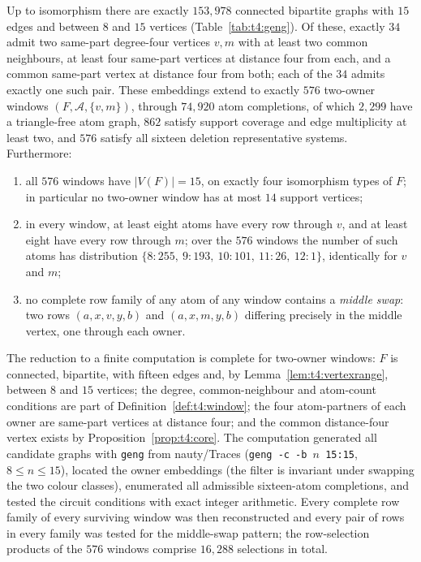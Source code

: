 \begin{theorem}\label{thm:t4:census}
Up to isomorphism there are exactly \(153{,}978\) connected bipartite
graphs with \(15\) edges and between \(8\) and \(15\) vertices
\textup{(}Table~\textup{\ref{tab:t4:geng}}\textup{)}. Of these, exactly
\(34\) admit two same-part degree-four vertices \(v,m\) with at least
two common neighbours, at least four same-part vertices at distance
four from each, and a common same-part vertex at distance four from
both; each of the \(34\) admits exactly one such pair. These
embeddings extend to exactly \(576\) two-owner windows
\((F,\mathcal A,\{v,m\})\), through \(74{,}920\) atom completions, of
which \(2{,}299\) have a triangle-free atom graph, \(862\) satisfy
support coverage and edge multiplicity at least two, and \(576\)
satisfy all sixteen deletion representative systems. Furthermore:
\begin{enumerate}[label=\textup{(\roman*)}]
\item all \(576\) windows have \(|V(F)|=15\), on exactly four
isomorphism types of \(F\); in particular no two-owner window has at
most \(14\) support vertices;
\item in every window, at least eight atoms have every row through
\(v\), and at least eight have every row through \(m\); over the
\(576\) windows the number of such atoms has distribution
\(\{8{:}255,\ 9{:}193,\ 10{:}101,\ 11{:}26,\ 12{:}1\}\), identically
for \(v\) and \(m\);
\item no complete row family of any atom of any window contains a
\emph{middle swap}: two rows \((a,x,v,y,b)\) and \((a,x,m,y,b)\)
differing precisely in the middle vertex, one through each owner.
\end{enumerate}
\end{theorem}

The reduction to a finite computation is complete for two-owner
windows: \(F\) is connected, bipartite, with fifteen edges and, by
Lemma~\ref{lem:t4:vertexrange}, between \(8\) and \(15\) vertices; the
degree, common-neighbour and atom-count conditions are part of
Definition~\ref{def:t4:window}; the four atom-partners of each owner
are same-part vertices at distance four; and the common distance-four
vertex exists by Proposition~\ref{prop:t4:core}. The computation
generated all candidate graphs with \texttt{geng} from nauty/Traces
\cite{McKayPiperno14} (\texttt{geng -c -b \(n\) 15:15},
\(8\le n\le15\)), located the owner embeddings (the filter is invariant
under swapping the two colour classes), enumerated all admissible
sixteen-atom completions, and tested the circuit conditions with exact
integer arithmetic. Every
complete row family of every surviving window was then reconstructed
and every pair of rows in every family was tested for the middle-swap
pattern; the row-selection products of the \(576\) windows comprise
\(16{,}288\) selections in total.


